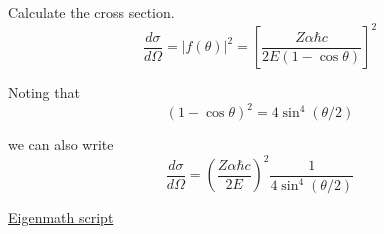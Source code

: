 Calculate the cross section.
\begin{equation*}
\frac{d\sigma}{d\Omega}=|f(\theta)|^2
=\left[\frac{Z\alpha\hbar c}{2E(1-\cos\theta)}\right]^2
\tag{2}
\end{equation*}

Noting that
\begin{equation*}
(1-\cos\theta)^2=4\sin^4(\theta/2)
\end{equation*}

we can also write
\begin{equation*}
\frac{d\sigma}{d\Omega}
=\left(\frac{Z\alpha\hbar c}{2E}\right)^2
\frac{1}{4\sin^4(\theta/2)}
\tag{3}
\end{equation*}

\href{https://georgeweigt.github.io/examples/rutherford-scattering-1-demo.html}{Eigenmath script}


